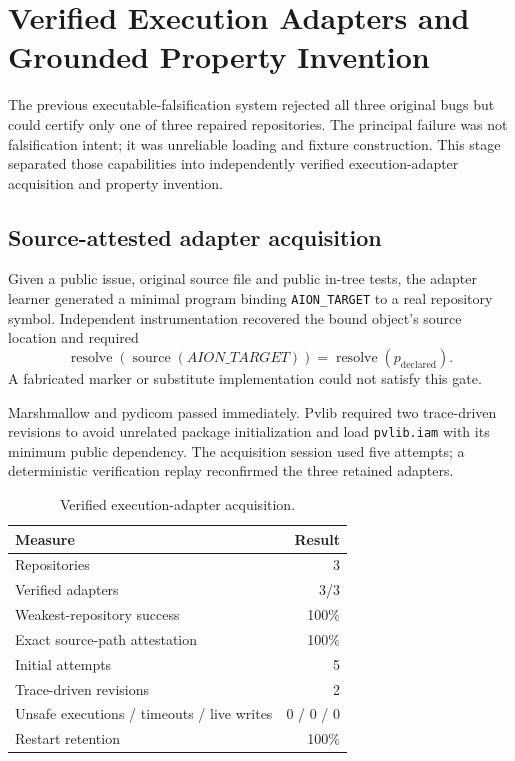 \section{Verified Execution Adapters and Grounded Property Invention}
\label{sec:verified-adapter-property-invention}

The previous executable-falsification system rejected all three original bugs
but could certify only one of three repaired repositories. The principal failure
was not falsification intent; it was unreliable loading and fixture
construction. This stage separated those capabilities into independently
verified execution-adapter acquisition and property invention.

\subsection{Source-attested adapter acquisition}

Given a public issue, original source file and public in-tree tests, the adapter
learner generated a minimal program binding \texttt{AION\_TARGET} to a real
repository symbol. Independent instrumentation recovered the bound object's
source location and required
\begin{equation}
 \operatorname{resolve}(\operatorname{source}(AION\_TARGET))
 = \operatorname{resolve}(p_{\mathrm{declared}}).
\end{equation}
A fabricated marker or substitute implementation could not satisfy this gate.

Marshmallow and pydicom passed immediately. Pvlib required two trace-driven
revisions to avoid unrelated package initialization and load
\texttt{pvlib.iam} with its minimum public dependency. The acquisition session
used five attempts; a deterministic verification replay reconfirmed the three
retained adapters.

\begin{table}[ht]
\centering
\caption{Verified execution-adapter acquisition.}
\label{tab:verified-adapters}
\begin{tabular}{lr}
\hline
Measure & Result \\
\hline
Repositories & 3 \\
Verified adapters & 3/3 \\
Weakest-repository success & 100\% \\
Exact source-path attestation & 100\% \\
Initial attempts & 5 \\
Trace-driven revisions & 2 \\
Unsafe executions / timeouts / live writes & 0 / 0 / 0 \\
Restart retention & 100\% \\
\hline
\end{tabular}
\end{table}

